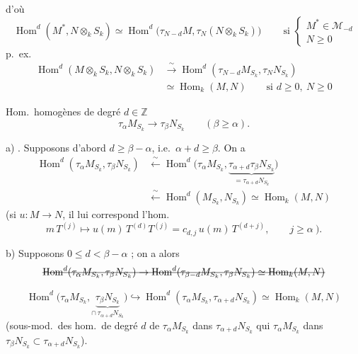 \documentclass[11pt,a4paper]{article}
\begin{document}
d'où
\[
  \boxed{\ \operatorname{Hom}^d(M^*, N \otimes_k S_k)
  \simeq \operatorname{Hom}^d\bigl(\tau_{N-d} M, \tau_N (N \otimes_k S_k)\bigr)\ }
  \qquad \text{si }
  \begin{cases} M^* \in \mathcal{M}_{-d} \\ N \geq 0 \end{cases}
\]
p.\ ex.
\[
  \boxed{
  \begin{aligned}
    \operatorname{Hom}^d(M \otimes_k S_k, N \otimes_k S_k)
    &\xrightarrow{\ \sim\ } \operatorname{Hom}^d(\tau_{N-d} M_{S_k}, \tau_N N_{S_k}) \\
    &\simeq \operatorname{Hom}_k(M, N)
    \qquad \text{si } d \geq 0,\ N \geq 0
  \end{aligned}}
\]

Hom.\ homogènes de degré $d \in \mathbb{Z}$
\[
  \tau_\alpha M_{S_k} \to \tau_\beta N_{S_k} \qquad (\beta \geq \alpha) .
\]

a) . Supposons d'abord $\boxed{d \geq \beta - \alpha}$, i.e.\
$\alpha + d \geq \beta$. On a 
\[
  \begin{aligned}
    \operatorname{Hom}^d(\tau_\alpha M_{S_k}, \tau_\beta N_{S_k})
    &\xleftarrow{\ \sim\ } \operatorname{Hom}^d\bigl(\tau_\alpha M_{S_k},
      \underbrace{\tau_{\alpha+d} \tau_\beta N_{S_k}}_{= \tau_{\alpha+d} N_{S_k}}\bigr) \\
    &\xleftarrow{\ \sim\ } \operatorname{Hom}^d(M_{S_k}, N_{S_k}) \simeq \operatorname{Hom}_k(M, N)
  \end{aligned}
\]
(si $u : M \to N$, il lui correspond l'hom.
\[
  m\, T^{(j)} \longmapsto u(m)\, T^{(d)} T^{(j)} = c_{d,j}\, u(m)\, T^{(d+j)} ,
  \qquad j \geq \alpha \ ) .
\]

b) Supposons $0 \leq d < \beta - \alpha$  ; on a alors
\[
  \text{\struck{$\operatorname{Hom}^d(\tau_\alpha M_{S_k}, \tau_\beta N_{S_k})
  \to \operatorname{Hom}^d(\tau_{\beta-d} M_{S_k}, \tau_\beta N_{S_k})
  \simeq \operatorname{Hom}_k(M, N)$}}
\]

\[
  \operatorname{Hom}^d\bigl(\tau_\alpha M_{S_k}, \underbrace{\tau_\beta N_{S_k}}_{\cap\ \tau_{\alpha+d} N_{S_k}}\bigr)
  \hookrightarrow \operatorname{Hom}^d(\tau_\alpha M_{S_k}, \tau_{\alpha+d} N_{S_k})
  \simeq \operatorname{Hom}_k(M, N)
\]
(sous-mod.\ des hom.\ de degré $d$ de $\tau_\alpha M_{S_k}$ dans
$\tau_{\alpha+d} N_{S_k}$ qui \uncertain{envoient} $\tau_\alpha M_{S_k}$ dans
$\tau_\beta N_{S_k} \subset \tau_{\alpha+d} N_{S_k}$).
\end{document}
